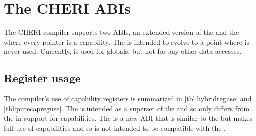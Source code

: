 \chapter{The CHERI ABIs}
\label{chp:abis}
\label{chap:abis} %

The CHERI compiler supports two ABIs, an extended version of the \mipsABI{} and the \purecapABI{} where every pointer is a capability.
The \purecapABI{} is intended to evolve to a point where  is never used.
Currently,  is used for globals, but not for any other data accesses.

\section{Register usage}

The compiler's use of capability registers is summarized in \autoref{tbl:hybridreguse} and \autoref{tbl:purecapreguse}.
The \hybridABI{} is intended as a superset of the \mipsABI{} and so only differs from the \mipsABI{} in support for capabilities.
The \purecapABI{} is a new ABI that is similar to the \mipsABI{} but makes full use of capabilities and so is not intended to be compatible with the \mipsABI{}.

